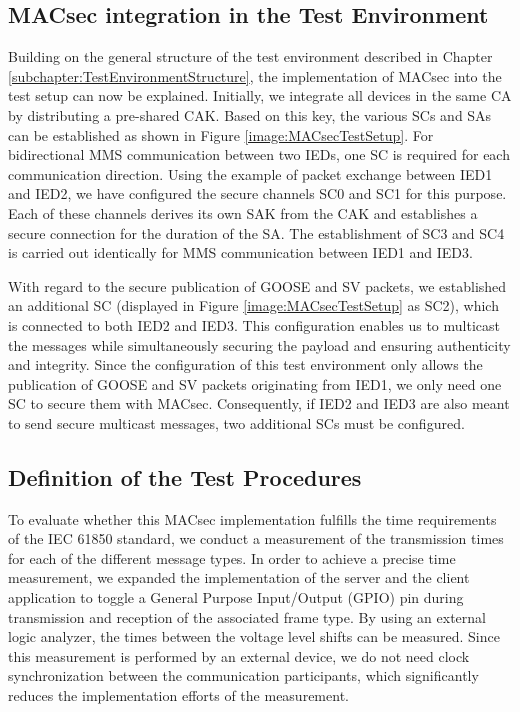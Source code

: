 \documentclass[conference, onecolumn, a4paper]{IEEEtran}
\begin{document}
\subsection{MACsec integration in the Test Environment}
\label{subchapter:TestEnvironmentMACsec}
\noindent Building on the general structure of the test environment described in Chapter \ref{subchapter:TestEnvironmentStructure}, the implementation of 
MACsec into the test setup can now be explained. Initially, we integrate all devices in the same CA by distributing a pre-shared CAK. Based on this key, 
the various SCs and SAs can be established as shown in Figure \ref{image:MACsecTestSetup}. For bidirectional MMS communication between two IEDs, one SC is 
required for each communication direction. Using the example of packet exchange between IED1 and IED2, we have configured the secure channels SC0 and SC1 
for this purpose. Each of these channels derives its own SAK from the CAK and establishes a secure connection for the duration of the SA. The establishment 
of SC3 and SC4 is carried out identically for MMS communication between IED1 and IED3.

\smallskip
With regard to the secure publication of GOOSE and SV packets, we established an additional SC (displayed in Figure \ref{image:MACsecTestSetup} as SC2), 
which is connected to both IED2 and IED3. This configuration enables us to multicast the messages while simultaneously securing the payload and ensuring 
authenticity and integrity. Since the configuration of this test environment only allows the publication of GOOSE and SV packets originating from IED1, 
we only need one SC to secure them with MACsec. Consequently, if IED2 and IED3 are also meant to send secure multicast messages, two additional SCs must 
be configured.   

\subsection{Definition of the Test Procedures}
\label{subchapter:TestProcedures}
\noindent To evaluate whether this MACsec implementation fulfills the time requirements of the IEC 61850 standard, we conduct a measurement of the 
transmission times for each of the different message types. In order to achieve a precise time measurement, we expanded the implementation of the server 
and the client application to toggle a General Purpose Input/Output (GPIO) pin during transmission and reception of the associated frame type. 
By using an external logic analyzer, the times between the voltage level shifts can be measured. Since this measurement is performed by an external 
device, we do not need clock synchronization between the communication participants, which significantly reduces the implementation efforts of the 
measurement. 
\end{document}
